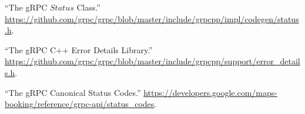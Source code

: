 \documentclass[11pt]{article}
\begin{document}
{{\begin{thebibliography}{40}
\mdbibitemlabel{{}[33]}\textquotedblleft{}The gRPC $Status$ Class.\textquotedblright{} \href{https://github.com/grpc/grpc/blob/master/include/grpcpp/impl/codegen/status.h}{{\ttfamily https://\hspace{0pt}github.\hspace{0pt}com/\hspace{0pt}grpc/\hspace{0pt}grpc/\hspace{0pt}blob/\hspace{0pt}master/\hspace{0pt}include/\hspace{0pt}grpcpp/\hspace{0pt}impl/\hspace{0pt}codegen/\hspace{0pt}status.\hspace{0pt}h}}.\label{grpcstatus}%

\mdbibitemlabel{{}[34]}\textquotedblleft{}The gRPC C++ Error Details Library.\textquotedblright{} \href{https://github.com/grpc/grpc/blob/master/include/grpcpp/support/error_details.h}{{\ttfamily https://\hspace{0pt}github.\hspace{0pt}com/\hspace{0pt}grpc/\hspace{0pt}grpc/\hspace{0pt}blob/\hspace{0pt}master/\hspace{0pt}include/\hspace{0pt}grpcpp/\hspace{0pt}support/\hspace{0pt}error\_\hspace{0pt}details.\hspace{0pt}h}}.\label{grpcerrordetails}%

\mdbibitemlabel{{}[35]}\textquotedblleft{}The gRPC Canonical Status Codes.\textquotedblright{} \href{https://developers.google.com/maps-booking/reference/grpc-api/status_codes}{{\ttfamily https://\hspace{0pt}developers.\hspace{0pt}google.\hspace{0pt}com/\hspace{0pt}maps-\hspace{0pt}booking/\hspace{0pt}reference/\hspace{0pt}grpc-\hspace{0pt}api/\hspace{0pt}status\_\hspace{0pt}codes}}.\label{grpcstatuscodes}%


\end{thebibliography}}}
\end{document}
